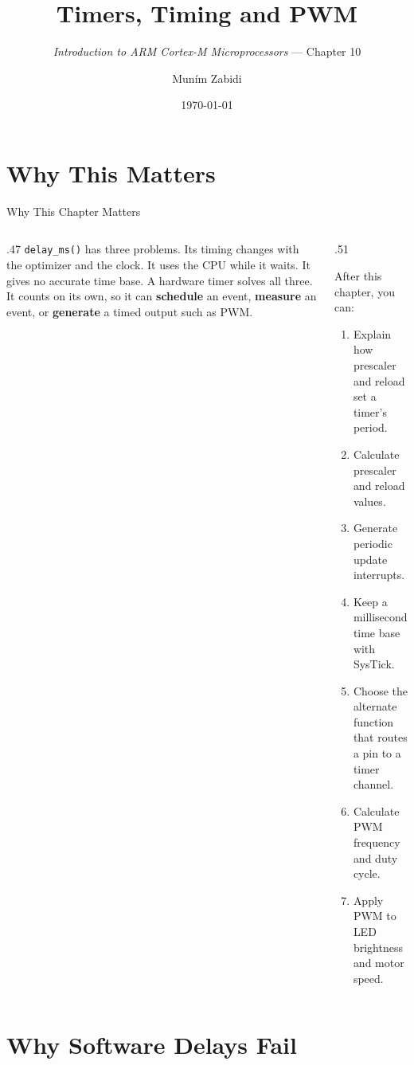 \documentclass[9pt,aspectratio=169,xcolor=table]{beamer}
\title{Timers, Timing and PWM}
\subtitle{\emph{Introduction to ARM Cortex-M Microprocessors} --- Chapter 10}
\author{Mun\'{i}m Zabidi}
\institute{\color{primary}Faculty of Electrical Engineering, Universiti Teknologi Malaysia}
\date{\today}
\begin{document}
\titlepage

\section{Why This Matters}

\begin{frame}{Why This Chapter Matters}
    \begin{columns}[T]
    \begin{column}{.47\textwidth}
        {\normalsize \texttt{delay\_ms()} has three problems. Its timing changes with the optimizer and the clock. It uses the CPU while it waits. It gives no accurate time base. A hardware timer solves all three. It counts on its own, so it can \textbf{schedule} an event, \textbf{measure} an event, or \textbf{generate} a timed output such as PWM.}
    \end{column}
    \begin{column}{.51\textwidth}
        \begin{block}{After this chapter, you can:}
        {\small
        \begin{enumerate}\itemsep2pt
            \item Explain how prescaler and reload set a timer's period.
            \item Calculate prescaler and reload values.
            \item Generate periodic update interrupts.
            \item Keep a millisecond time base with SysTick.
            \item Choose the alternate function that routes a pin to a timer channel.
            \item Calculate PWM frequency and duty cycle.
            \item Apply PWM to LED brightness and motor speed.
        \end{enumerate}}
        \end{block}
    \end{column}
    \end{columns}
\end{frame}


\section{Why Software Delays Fail}
\end{document}
